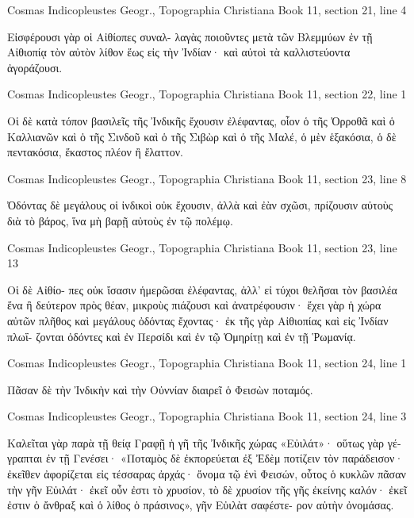 \documentclass[12pt,letterpaper,twoside,final]{memoir}
\begin{document}
\begin{greek}
Cosmas Indicopleustes Geogr., Topographia Christiana 
Book 11, section 21, line 4

                             Εἰσφέρουσι γὰρ οἱ Αἰθίοπες συναλ-
λαγὰς ποιοῦντες μετὰ τῶν Βλεμμύων ἐν τῇ Αἰθιοπίᾳ τὸν 
αὐτὸν λίθον ἕως εἰς τὴν Ἰνδίαν· καὶ αὐτοὶ τὰ καλλιστεύοντα 
ἀγοράζουσι. 



Cosmas Indicopleustes Geogr., Topographia Christiana 
Book 11, section 22, line 1

Οἱ δὲ κατὰ τόπον βασιλεῖς τῆς Ἰνδικῆς ἔχουσιν 
ἐλέφαντας, οἷον ὁ τῆς Ὀρροθᾶ καὶ ὁ Καλλιανῶν καὶ ὁ τῆς 
Σινδοῦ καὶ ὁ τῆς Σιβὼρ καὶ ὁ τῆς Μαλέ, ὁ μὲν ἑξακόσια, ὁ δὲ 
πεντακόσια, ἕκαστος πλέον ἢ ἔλαττον. 



Cosmas Indicopleustes Geogr., Topographia Christiana 
Book 11, section 23, line 8

                                           Ὀδόντας δὲ μεγάλους 
οἱ ἰνδικοὶ οὐκ ἔχουσιν, ἀλλὰ καὶ ἐὰν σχῶσι, πρίζουσιν αὐτοὺς 
διὰ τὸ βάρος, ἵνα μὴ βαρῇ αὐτοὺς ἐν τῷ πολέμῳ. 



Cosmas Indicopleustes Geogr., Topographia Christiana 
Book 11, section 23, line 13

                                                              Οἱ δὲ Αἰθίο-
πες οὐκ ἴσασιν ἡμερῶσαι ἐλέφαντας, ἀλλ' εἰ τύχοι θελῆσαι 
τὸν βασιλέα ἕνα ἢ δεύτερον πρὸς θέαν, μικροὺς πιάζουσι καὶ 
ἀνατρέφουσιν· ἔχει γὰρ ἡ χώρα αὐτῶν πλῆθος καὶ μεγάλους 
ὀδόντας ἔχοντας· ἐκ τῆς γὰρ Αἰθιοπίας καὶ εἰς Ἰνδίαν πλωΐ-
ζονται ὀδόντες καὶ ἐν Περσίδι καὶ ἐν τῷ Ὁμηρίτῃ καὶ ἐν τῇ 
Ῥωμανίᾳ. 



Cosmas Indicopleustes Geogr., Topographia Christiana 
Book 11, section 24, line 1

Πᾶσαν δὲ τὴν Ἰνδικὴν καὶ τὴν Οὐννίαν διαιρεῖ ὁ 
Φεισὼν ποταμός. 



Cosmas Indicopleustes Geogr., Topographia Christiana 
Book 11, section 24, line 3

                   Καλεῖται γὰρ παρὰ τῇ θείᾳ Γραφῇ ἡ γῆ τῆς 
Ἰνδικῆς χώρας «Εὐιλάτ»· οὕτως γὰρ γέγραπται ἐν τῇ 
Γενέσει· «Ποταμὸς δὲ ἐκπορεύεται ἐξ Ἐδὲμ ποτίζειν τὸν 
παράδεισον· ἐκεῖθεν ἀφορίζεται εἰς τέσσαρας ἀρχάς· ὄνομα 
τῷ ἑνὶ Φεισών, οὗτος ὁ κυκλῶν πᾶσαν τὴν γῆν Εὐιλάτ· ἐκεῖ 
οὖν ἐστι τὸ χρυσίον, τὸ δὲ χρυσίον τῆς γῆς ἐκείνης καλόν· ἐκεῖ 
ἐστιν ὁ ἄνθραξ καὶ ὁ λίθος ὁ πράσινος», γῆν Εὐιλὰτ σαφέστε-
ρον αὐτὴν ὀνομάσας. 




\end{greek}
\end{document}
